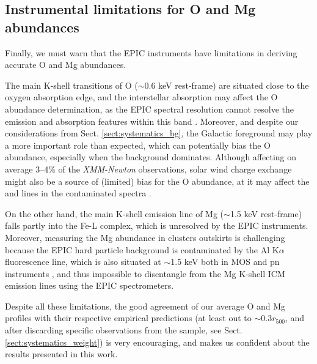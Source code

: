 \documentclass{aa}
\begin{document}
\subsection{Instrumental limitations for O and Mg abundances}\label{sect:systematics_EPIC}

Finally, we must warn that the EPIC instruments have limitations in deriving accurate O and Mg abundances. 

The main K-shell transitions of O ($\sim$0.6 keV rest-frame) are situated close to the oxygen absorption edge, and the interstellar absorption may affect the O abundance determination, as the EPIC spectral resolution cannot resolve the emission and absorption features within this band \citep[see e.g.][]{2004A&A...423...49D}. Moreover, and despite our considerations from Sect. \ref{sect:systematics_bg}, the Galactic foreground may play a more important role than expected, which can potentially bias the O abundance, especially when the background dominates. Although affecting on average 3--4\% of the \textit{XMM-Newton} observations, solar wind charge exchange might also be a source of (limited) bias for the O abundance, at it may affect the  and  lines in the contaminated spectra \citep[e.g.][]{2004ApJ...610.1182S,2011A&A...527A.115C}.

On the other hand, the main K-shell emission line of Mg ($\sim$1.5 keV rest-frame) falls partly into the Fe-L complex, which is unresolved by the EPIC instruments. Moreover, measuring the Mg abundance in clusters outskirts is challenging because the EPIC hard particle background is contaminated by the Al K$\alpha$ fluorescence line, which is also situated at $\sim$1.5 keV both in MOS and pn instruments \citep[e.g.][]{2015A&A...575A..37M}, and thus impossible to disentangle from the Mg K-shell ICM emission lines using the EPIC spectrometers.

Despite all these limitations, the good agreement of our average O and Mg profiles with their respective empirical predictions (at least out to $\sim$0.3$r_{500}$, and after discarding specific observations from the sample, see Sect. \ref{sect:systematics_weight}) is very encouraging, and makes us confident about the results presented in this work.
\end{document}

